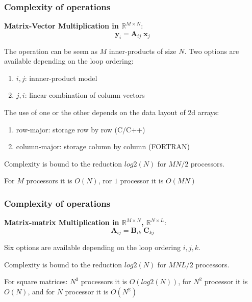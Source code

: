 \begin{frame}
  \frametitle{Complexity of operations}

\textbf{Matrix-Vector Multiplication in $\mathbb R^{M\times N}$}:
\[
\bm y_i = \bm A_{ij} \; \bm x_j
\]

\medskip
The operation can be seem as $M$ inner-products of size $N$.
Two options are available depending on the loop ordering:
\begin{enumerate}
\item $i,j$: innner-product model
\item $j,i$: linear combination of column vectors
\end{enumerate}


\bigskip
The use of one or the other depends on the data layout of 2d arrays:
\begin{enumerate}
\item row-major: storage row by row (C/C++)
\item column-major: storage column by column (FORTRAN)
\end{enumerate}

\medskip
Complexity is bound to the reduction $log2(N)$ for $M N/2$ processors.

\medskip
For $M$ processors it is $O(N)$, ror $1$ processor it is $O(MN)$ 

\end{frame}

\begin{frame}
  \frametitle{Complexity of operations}

\textbf{Matrix-matrix Multiplication in $\mathbb R^{M\times N}$, $\mathbb R^{N\times L}$}:
\[
\bm A_{ij} = \bm B_{ik} \; \bm C_{kj}
\]

\medskip
Six options are available depending on the loop ordering $i,j,k$.

\medskip
Complexity is bound to the reduction $log2(N)$ for $M N L/2$ processors.


\medskip
For square matrices: $N^3$ processors it is $O(log2(N))$, for $N^2$ processor it is $O(N)$, and for $N$ processor it is $O(N^2)$

\end{frame}

